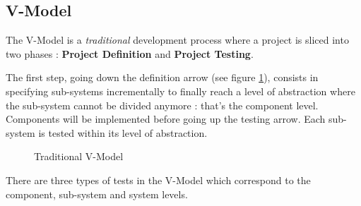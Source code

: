 \subsection{V-Model}

The V-Model is a \textit{traditional} development process where a project is sliced into two phases : \textbf{Project Definition} and \textbf{Project Testing}.

The first step, going down the definition arrow (see figure \ref{Traditional V-Model}), consists in specifying sub-systems incrementally to finally reach a level of abstraction where the sub-system cannot be divided anymore : that's the component level. Components will be implemented before going up the testing arrow. Each sub-system is tested within its level of abstraction\cite{7890592}.

\begin{figure}[ht]
    \centering
    \caption{Traditional V-Model}
    \label{Traditional V-Model}
\end{figure}

There are three types of tests in the V-Model which correspond to the component, sub-system and system levels.

